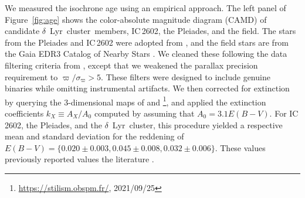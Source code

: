 \documentclass[12pt,modern,twocolumn,tighten,linenumbers,trackchanges]{aastex63}
\newcommand{\cn}{$\delta$\ Lyr\ cluster} %
\begin{document}
We measured the isochrone age using an empirical approach.  The left
panel of Figure~\ref{fig:age} shows the color-absolute magnitude
diagram (CAMD) of candidate \cn\ members, IC\,2602, the Pleiades, and
the field.  The stars from the Pleiades and IC\,2602 were adopted from
\citet{CantatGaudin2018a}, and the field stars are from the Gaia EDR3
Catalog of Nearby Stars \citep{gaia_gcns_2021}.  We cleaned these
following the data filtering criteria from \citet[][Appendix
B]{GaiaCollaboration2018}, except that we weakened the parallax
precision requirement to $\varpi/\sigma_\varpi>5$.   These filters were
designed to include genuine binaries while omitting instrumental
artifacts.  We then corrected for extinction by querying the
3-dimensional maps of \citet{capitanio_threedimensional_2017} and
\citet{lallement_threedimensional_2018}\footnote{\url{https://stilism.obspm.fr/},
2021/09/25}, and applied the extinction coefficients $k_X\equiv
A_X/A_0$ computed by \citet{GaiaCollaboration2018} assuming that $A_0
= 3.1 E(B-V)$.  For IC\,2602, the Pleiades, and the \cn, this
procedure yielded a respective mean and standard deviation for the
reddening of $E(B-V)=\{0.020\pm0.003, 0.045\pm0.008, 0.032\pm0.006\}$.
These values  previously reported values
 the literature \citep[{\it
e.g.},][]{GaiaCollaboration2018,KounkelCovey2019,bossini_age_2019}.

%
%
%
\end{document}

